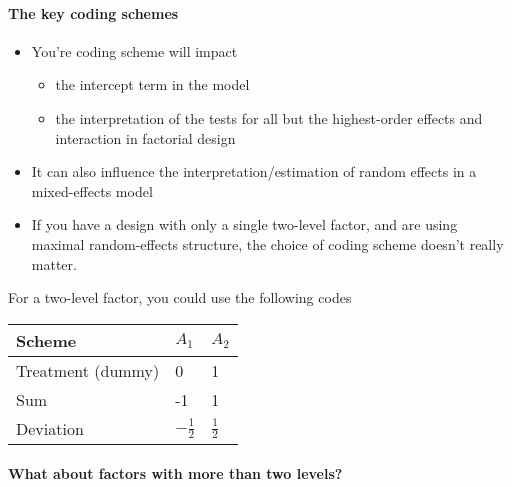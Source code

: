 \documentclass[
]{article}
\providecommand{\tightlist}{%
  \setlength{\itemsep}{0pt}\setlength{\parskip}{0pt}}
\begin{document}
\hypertarget{the-key-coding-schemes}{%
\paragraph{The key coding schemes}\label{the-key-coding-schemes}}

\begin{itemize}
\tightlist
\item
  You're coding scheme will impact

  \begin{itemize}
  \tightlist
  \item
    the intercept term in the model
  \item
    the interpretation of the tests for all but the highest-order
    effects and interaction in factorial design
  \end{itemize}
\item
  It can also influence the interpretation/estimation of random effects
  in a mixed-effects model
\item
  If you have a design with only a single two-level factor, and are
  using maximal random-effects structure, the choice of coding scheme
  doesn't really matter.
\end{itemize}

For a two-level factor, you could use the following codes

\begin{longtable}[]{@{}lll@{}}
\toprule\noalign{}
Scheme & \(A_{1}\) & \(A_{2}\) \\
\midrule\noalign{}
\endhead
\bottomrule\noalign{}
\endlastfoot
Treatment (dummy) & 0 & 1 \\
Sum & -1 & 1 \\
Deviation & \(-\frac{1}{2}\) & \(\frac{1}{2}\) \\
\end{longtable}

\hypertarget{what-about-factors-with-more-than-two-levels}{%
\paragraph{What about factors with more than two
levels?}\label{what-about-factors-with-more-than-two-levels}}
\end{document}
